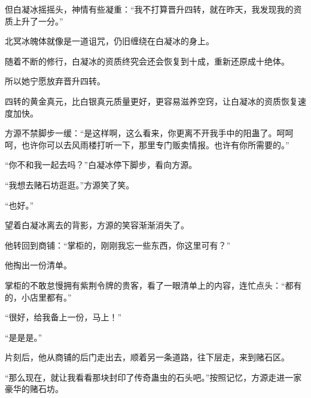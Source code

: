 \begin{this_body}
但白凝冰摇摇头，神情有些凝重：“我不打算晋升四转，就在昨天，我发现我的资质上升了一分。”

北冥冰魄体就像是一道诅咒，仍旧缠绕在白凝冰的身上。

随着不断的修行，白凝冰的资质终究会还会恢复到十成，重新还原成十绝体。

所以她宁愿放弃晋升四转。

四转的黄金真元，比白银真元质量更好，更容易滋养空窍，让白凝冰的资质恢复速度加快。

方源不禁脚步一缓：“是这样啊，这么看来，你更离不开我手中的阳蛊了。呵呵呵，也许你可以去风雨楼打听一下，那里专门贩卖情报。也许有你所需要的。”

“你不和我一起去吗？”白凝冰停下脚步，看向方源。

“我想去赌石坊逛逛。”方源笑了笑。

“也好。”

望着白凝冰离去的背影，方源的笑容渐渐消失了。

他转回到商铺：“掌柜的，刚刚我忘一些东西，你这里可有？”

他掏出一份清单。

掌柜的不敢怠慢拥有紫荆令牌的贵客，看了一眼清单上的内容，连忙点头：“都有的，小店里都有。”

“很好，给我备上一份，马上！”

“是是是。”

片刻后，他从商铺的后门走出去，顺着另一条道路，往下层走，来到赌石区。

“那么现在，就让我看看那块封印了传奇蛊虫的石头吧。”按照记忆，方源走进一家豪华的赌石坊。

\end{this_body}

